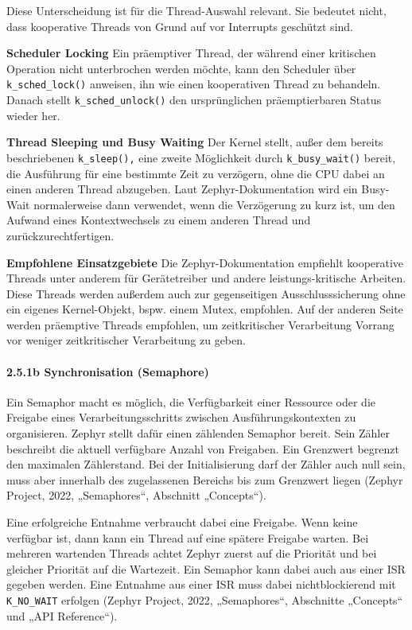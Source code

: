 Diese Unterscheidung ist für die Thread-Auswahl relevant. Sie bedeutet nicht, dass kooperative Threads von Grund auf vor Interrupts geschützt sind.

\textbf{Scheduler Locking }Ein präemptiver Thread, der während einer kritischen Operation nicht unterbrochen werden möchte, kann den Scheduler über \lstinline[style=fileinline]|k_sched_lock()| anweisen, ihn wie einen kooperativen Thread zu behandeln. Danach stellt \lstinline[style=fileinline]|k_sched_unlock()| den ursprünglichen präemptierbaren Status wieder her.

\textbf{Thread Sleeping und Busy Waiting }Der Kernel stellt, außer dem bereits beschriebenen \lstinline[style=fileinline]|k_sleep(),| eine zweite Möglichkeit durch \lstinline[style=fileinline]|k_busy_wait()| bereit, die Ausführung für eine bestimmte Zeit zu verzögern, ohne die CPU dabei an einen anderen Thread abzugeben. Laut Zephyr-Dokumentation wird ein Busy-Wait normalerweise dann verwendet, wenn die Verzögerung zu kurz ist, um den Aufwand eines Kontextwechsels zu einem anderen Thread und zurückzurechtfertigen.

\textbf{Empfohlene Einsatzgebiete} Die Zephyr-Dokumentation empfiehlt kooperative Threads unter anderem für Gerätetreiber und andere leistungs-kritische Arbeiten. Diese Threads werden außerdem auch zur gegenseitigen Ausschlusssicherung ohne ein eigenes Kernel-Objekt, bspw. einem Mutex, empfohlen. Auf der anderen Seite werden präemptive Threads empfohlen, um zeitkritischer Verarbeitung Vorrang vor weniger zeitkritischer Verarbeitung zu geben.

\paragraph*{\textbf{2.5.1b Synchronisation (Semaphore)}}
Ein Semaphor macht es möglich, die Verfügbarkeit einer Ressource oder die Freigabe eines Verarbeitungsschritts zwischen Ausführungskontexten zu organisieren. Zephyr stellt dafür einen zählenden Semaphor bereit. Sein Zähler beschreibt die aktuell verfügbare Anzahl von Freigaben. Ein Grenzwert begrenzt den maximalen Zählerstand. Bei der Initialisierung darf der Zähler auch null sein, muss aber innerhalb des zugelassenen Bereichs bis zum Grenzwert liegen (Zephyr Project, 2022, „Semaphores“, Abschnitt „Concepts“).

Eine erfolgreiche Entnahme verbraucht dabei eine Freigabe. Wenn keine verfügbar ist, dann kann ein Thread auf eine spätere Freigabe warten. Bei mehreren wartenden Threads achtet Zephyr zuerst auf die Priorität und bei gleicher Priorität auf die Wartezeit. Ein Semaphor kann dabei auch aus einer ISR gegeben werden. Eine Entnahme aus einer ISR muss dabei nichtblockierend mit \lstinline[style=fileinline]|K_NO_WAIT| erfolgen (Zephyr Project, 2022, „Semaphores“, Abschnitte „Concepts“ und „API Reference“).


